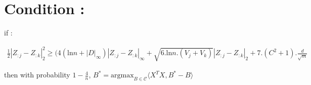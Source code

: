 \section*{Condition :}

if :

\begin{align*}
\frac{1}{2}|Z_{:j} - Z_{:k}|_2^2 \ge (4(\mbox{ln}n+|D|_{\infty})|Z_{:j} - Z_{:k}|_{\infty} + \sqrt{6.\mbox{ln}n.(V_{j}+V_{k})} |Z_{:j} - Z_{:k}|_2 + 7.(C^2+1).\frac{d}{\sqrt{m}}
\end{align*}

then with probability $1 - \frac{4}{n}$, $B^*=\mbox{argmax}_{B \in \mathcal{C}}\langle X^TX, B^* - B \rangle$